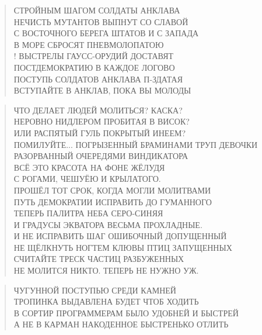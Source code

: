 \poemtitle{***}
\begin{verse}
СТРОЙНЫМ ШАГОМ СОЛДАТЫ АНКЛАВА\\
НЕЧИСТЬ МУТАНТОВ ВЫПНУТ СО СЛАВОЙ\\
С ВОСТОЧНОГО БЕРЕГА ШТАТОВ И С ЗАПАДА\\
В МОРЕ СБРОСЯТ ПНЕВМОЛОПАТОЮ\\!
ВЫСТРЕЛЫ ГАУСС-ОРУДИЙ ДОСТАВЯТ\\
ПОСТДЕМОКРАТИЮ В КАЖДОЕ ЛОГОВО\\
ПОСТУПЬ СОЛДАТОВ АНКЛАВА П-ЗДАТАЯ\\
ВСТУПАЙТЕ В АНКЛАВ, ПОКА ВЫ МОЛОДЫ
\end{verse}

\poemtitle{***}
\begin{verse}
ЧТО ДЕЛАЕТ ЛЮДЕЙ МОЛИТЬСЯ? КАСКА?\\
НЕРОВНО НИДЛЕРОМ ПРОБИТАЯ В ВИСОК?\\
ИЛИ РАСПЯТЫЙ ГУЛЬ ПОКРЫТЫЙ ИНЕЕМ?\\
ПОМИЛУЙТЕ... ПОГРЫЗЕННЫЙ БРАМИНАМИ ТРУП ДЕВОЧКИ\\
РАЗОРВАННЫЙ ОЧЕРЕДЯМИ ВИНДИКАТОРА\\
ВСЁ ЭТО КРАСОТА НА ФОНЕ ЖЁЛУДЯ\\
С РОГАМИ, ЧЕШУЁЮ И КРЫЛАТОГО.\\
ПРОШЁЛ ТОТ СРОК, КОГДА МОГЛИ МОЛИТВАМИ\\
ПУТЬ ДЕМОКРАТИИ ИСПРАВИТЬ ДО ГУМАННОГО\\
ТЕПЕРЬ ПАЛИТРА НЕБА СЕРО-СИНЯЯ\\
И ГРАДУСЫ ЭКВАТОРА ВЕСЬМА ПРОХЛАДНЫЕ.\\
И НЕ ИСПРАВИТЬ ШАГ ОШИБОЧНЫЙ ДОПУЩЕННЫЙ\\
НЕ ЩЁЛКНУТЬ НОГТЕМ КЛЮВЫ ПТИЦ ЗАПУЩЕННЫХ\\
СЧИТАЙТЕ ТРЕСК ЧАСТИЦ РАЗБУЖЕННЫХ\\
НЕ МОЛИТСЯ НИКТО. ТЕПЕРЬ НЕ НУЖНО УЖ.
\end{verse}

\poemtitle{***}
\begin{verse}
ЧУГУННОЙ ПОСТУПЬЮ СРЕДИ КАМНЕЙ\\
ТРОПИНКА ВЫДАВЛЕНА БУДЕТ ЧТОБ ХОДИТЬ\\
В СОРТИР ПРОГРАММЕРАМ БЫЛО УДОБНЕЙ И БЫСТРЕЙ\\
А НЕ В КАРМАН НАКОДЕННОЕ БЫСТРЕНЬКО ОТЛИТЬ
\end{verse}

